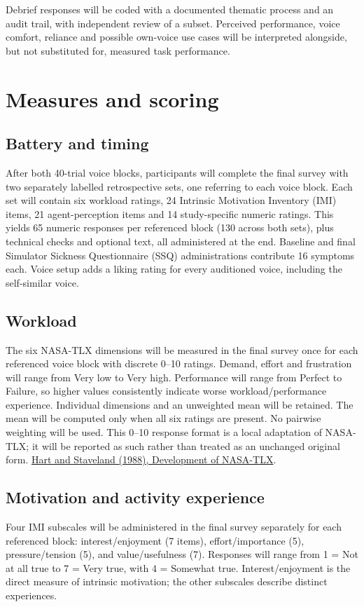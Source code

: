 \documentclass[11pt,letterpaper]{article}
\begin{document}
Debrief responses will be coded with a documented thematic process and an audit trail, with independent review of a subset. Perceived performance, voice comfort, reliance and possible own-voice use cases will be interpreted alongside, but not substituted for, measured task performance.
\section{Measures and scoring}
\subsection{Battery and timing}
After both 40-trial voice blocks, participants will complete the final survey with two separately labelled retrospective sets, one referring to each voice block. Each set will contain six workload ratings, 24 Intrinsic Motivation Inventory (IMI) items, 21 agent-perception items and 14 study-specific numeric ratings. This yields 65 numeric responses per referenced block (130 across both sets), plus technical checks and optional text, all administered at the end. Baseline and final Simulator Sickness Questionnaire (SSQ) administrations contribute 16 symptoms each. Voice setup adds a liking rating for every auditioned voice, including the self-similar voice.

\subsection{Workload}
The six NASA-TLX dimensions will be measured in the final survey once for each referenced voice block with discrete 0--10 ratings. Demand, effort and frustration will range from Very low to Very high. Performance will range from Perfect to Failure, so higher values consistently indicate worse workload/performance experience. Individual dimensions and an unweighted mean will be retained. The mean will be computed only when all six ratings are present. No pairwise weighting will be used. This 0--10 response format is a local adaptation of NASA-TLX; it will be reported as such rather than treated as an unchanged original form.
\href{https://doi.org/10.1016/S0166-4115(08)62386-9}{Hart and Staveland (1988), Development of NASA-TLX}.

\subsection{Motivation and activity experience}
Four IMI subscales will be administered in the final survey separately for each referenced block: interest/enjoyment (7 items), effort/importance (5), pressure/tension (5), and value/usefulness (7). Responses will range from 1 = Not at all true to 7 = Very true, with 4 = Somewhat true. Interest/enjoyment is the direct measure of intrinsic motivation; the other subscales describe distinct experiences.
\end{document}
